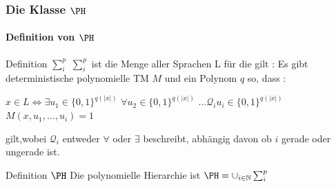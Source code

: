 \begin{frame}
	\frametitle{Die Klasse $\PH$}
	\framesubtitle{Definition von $\PH$}
	
	\begin{KITinfoblock}{Definition	$\sum_{i}^{p} $ }
		$\sum_{i}^{p} $ ist die Menge aller Sprachen L f\"ur die gilt : \newline
		Es gibt deterministische polynomielle TM $M$ und ein Polynom $q$ so, dass :
		\newline
		
		$x \in L \Leftrightarrow \exists u_1 \in {\lbrace 0,1 \rbrace }^{q(|x|)}$
		$\forall u_2 \in {\lbrace 0,1 \rbrace }^{q(|x|)}$
		$\ldots \mathcal{Q}_i u_i \in {\lbrace 0,1 \rbrace }^{q(|x|)}$
		$M(x,u_1 ,\ldots , u_i) = 1$	\newline
		
		gilt,wobei $\mathcal{Q}_i$ entweder $\forall$ oder $\exists$ beschreibt,
		abh\"angig davon ob $i$ gerade oder ungerade ist.
	\end{KITinfoblock}
	\pause
	\bigskip
	
	\begin{KITinfoblock}{Definition $\PH$}
		Die polynomielle Hierarchie ist $\PH = {\cup}_{i \in \mathbb{N}} \sum_{i}^{p}$
	\end{KITinfoblock}
\end{frame}
